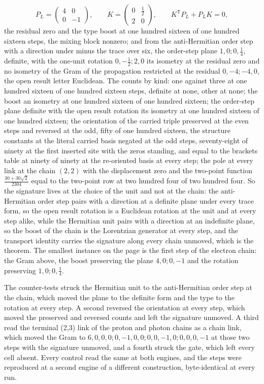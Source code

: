 \begin{chproof}
\begin{equation}
P_{L} = \begin{pmatrix} 4 & 0 \\ 0 & -1 \end{pmatrix} , \qquad K = \begin{pmatrix} 0 & \tfrac{1}{2} \\ 2 & 0 \end{pmatrix} , \qquad K^{\mathsf{T}} P_{L} + P_{L} K = 0 ,
\end{equation}
the residual zero and the type boost at one hundred sixteen of one hundred sixteen steps, the mixing block nonzero; and from the anti-Hermitian order step with a direction under minus the trace over six, the order-step plane $1,0;0,\tfrac{1}{4}$, definite, with the one-unit rotation $0,-\tfrac{1}{2};2,0$ its isometry at the residual zero and no isometry of the Gram of the propagation restricted at the residual $0,-4;-4,0$, the open result letter Euclidean. The counts by kind: one against three at one hundred sixteen of one hundred sixteen steps, definite at none, other at none; the boost an isometry at one hundred sixteen of one hundred sixteen; the order-step plane definite with the open result rotation its isometry at one hundred sixteen of one hundred sixteen; the orientation of the carried triple preserved at the even steps and reversed at the odd, fifty of one hundred sixteen, the structure constants at the literal carried basis negated at the odd steps, seventy-eight of ninety at the first inserted site with the zeros standing, and equal to the brackets table at ninety of ninety at the re-oriented basis at every step; the pole at every link at the chain $(2,2)$ with the displacement zero and the two-point function $\tfrac{30 + 30\sqrt{2}}{2304}$ equal to the two-point row at two hundred four of two hundred four. So the signature lives at the choice of the unit and not at the chain: the anti-Hermitian order step pairs with a direction at a definite plane under every trace form, so the open result rotation is a Euclidean rotation at the unit and at every step alike, while the Hermitian unit pairs with a direction at an indefinite plane, so the boost of the chain is the Lorentzian generator at every step, and the transport identity carries the signature along every chain unmoved, which is the theorem. The smallest instance on the page is the first step of the electron chain: the Gram above, the boost preserving the plane $4,0;0,-1$ and the rotation preserving $1,0;0,\tfrac{1}{4}$.

The counter-tests struck the Hermitian unit to the anti-Hermitian order step at the chain, which moved the plane to the definite form and the type to the rotation at every step. A second reversed the orientation at every step, which moved the preserved and reversed counts and left the signature unmoved. A third read the terminal (2,3) link of the proton and photon chains as a chain link, which moved the Gram to $6,0,0,0;0,-1,0,0;0,0,-1,0;0,0,0,-1$ at those two steps with the signature unmoved, and a fourth struck the gate, which left every cell absent. Every control read the same at both engines, and the steps were reproduced at a second engine of a different construction, byte-identical at every run.
\end{chproof}
